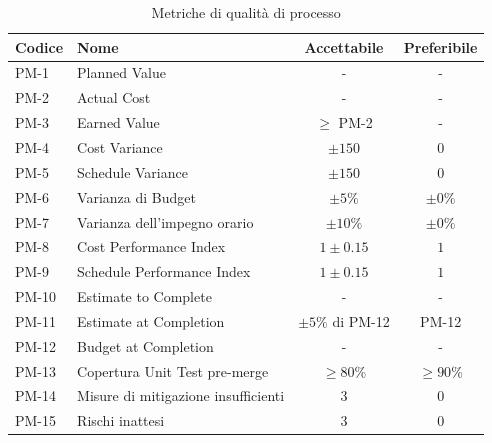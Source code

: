 \documentclass[a4paper,11pt,oneside]{scrartcl}
\begin{document}
\begin{table}[H]
    \centering
    \renewcommand{\arraystretch}{1.3}
    \begin{tabularx}{\textwidth}{@{}p{}Xcc@{}}
        \toprule
        \textbf{Codice} & \textbf{Nome}                       & \textbf{Accettabile} & \textbf{Preferibile} \\
        \midrule
        PM-1            & Planned Value                       & -                    & -                    \\
        PM-2            & Actual Cost                         & -                    & -                    \\
        PM-3            & Earned Value                        & $\geq$ PM-2          & -                    \\
        PM-4            & Cost Variance                       & $\pm 150$            & $0$                  \\
        PM-5            & Schedule Variance                   & $\pm 150$            & $0$                  \\
        PM-6            & Varianza di Budget                  & $\pm 5\%$            & $\pm 0\%$            \\
        PM-7            & Varianza dell'impegno orario        & $\pm 10\%$           & $\pm 0\%$            \\
        PM-8            & Cost Performance Index              & $1 \pm 0.15$         & $1$                  \\
        PM-9            & Schedule Performance Index          & $1 \pm 0.15$         & $1$                  \\
        PM-10           & Estimate to Complete                & -                    & -                    \\
        PM-11           & Estimate at Completion              & $\pm 5\%$ di PM-12   & PM-12                \\
        PM-12           & Budget at Completion                & -                    & -                    \\
        PM-13           & Copertura Unit Test pre-merge       & $\ge 80\%$           & $\ge 90\%$           \\
        PM-14           & Misure di mitigazione insufficienti & $3$                  & $0$                  \\
        PM-15           & Rischi inattesi                     & $3$                  & $0$                  \\
        \bottomrule
    \end{tabularx}
    \caption{Metriche di qualità di processo}
\end{table}
\end{document}
